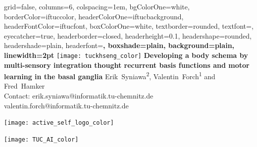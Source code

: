 \documentclass[portrait,final,a0paper,fontscale=0.33]{baposter}
\begin{document}
\begin{poster}%
	{
		grid=false,
		columns=6,
		colspacing=1em,
		bgColorOne=white,
		borderColor=iftuccolor,
		headerColorOne=iftucbackground,
		headerFontColor=iftucfont,
		boxColorOne=white,
		textborder=rounded,
		textfont=\small,
		eyecatcher=true,
		headerborder=closed,
		headerheight=0.1\textheight,
		headershape=rounded,
		headershade=plain,
		headerfont=\Large\bf, %
		boxshade=plain,
		background=plain,
		linewidth=2pt
	}
	{\texttt{[image: tuckhseng\_color]}} 
	{\bf\Large{Developing a body schema by multi-sensory integration thought recurrent basis functions and motor learning in the basal ganglia}\vspace{1em}}
	{\large Erik~Syniawa\textsuperscript{2}, Valentin~Forch\textsuperscript{1} and Fred~Hamker \\ \vspace{0.5em}
	\small Contact: erik.syniawa@informatik.tu-chemnitz.de \\
	\hspace{43pt} valentin.forch@informatik.tu-chemnitz.de
	}
	{	
		\begin{minipage}[r]{0.1\textwidth}
			\texttt{[image: active\_self\_logo\_color]}
		\end{minipage}
		\hfill
		\begin{minipage}[r]{0.1\textwidth}
			\texttt{[image: TUC\_AI\_color]}
		\end{minipage}
		
	}

\end{poster}
\end{document}
